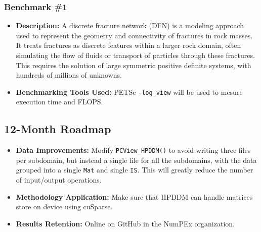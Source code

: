 \subsubsection{Benchmark \#1}
\begin{itemize}
    \item \textbf{Description:} A discrete fracture network (DFN) is a modeling approach used to represent the geometry and connectivity of fractures in rock masses. It treats fractures as discrete features within a larger rock domain, often simulating the flow of fluids or transport of particles through these fractures. This requires the solution of large symmetric positive definite systems, with hundreds of millions of unknowns.
    \item \textbf{Benchmarking Tools Used:} PETSc \verb!-log_view! will be used to mesure execution time and FLOPS.
\end{itemize}

\subsection{12-Month Roadmap}
\label{sec:WP3:HPDDM:roadmap}

\begin{itemize}
    \item \textbf{Data Improvements:} Modify \verb!PCView_HPDDM()! to avoid writing three files per subdomain, but instead a single file for all the subdomains, with the data grouped into a single \verb!Mat! and single \verb!IS!. This will greatly reduce the number of input/output operations.
    \item \textbf{Methodology Application:} Make sure that HPDDM can handle matrices store on device using cuSparse.
    \item \textbf{Results Retention:} Online on GitHub in the NumPEx organization.
\end{itemize}

